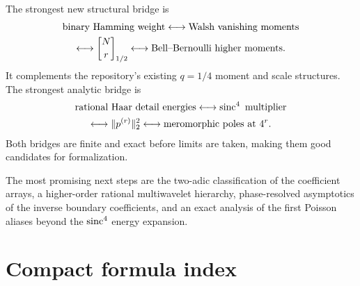 \documentclass[11pt]{article}
\theoremstyle{definition}
\theoremstyle{remark}
\begin{document}
The strongest new structural bridge is
\[
 \begin{gathered}
 \text{binary Hamming weight}
 \longleftrightarrow
 \text{Walsh vanishing moments}\\
 \longleftrightarrow
 \qbinom{N}{r}{1/2}
 \longleftrightarrow
 \text{Bell--Bernoulli higher moments}.
 \end{gathered}
\]
It complements the repository's existing $q=1/4$ moment and scale structures.
The strongest analytic bridge is
\[
 \begin{gathered}
 \text{rational Haar detail energies}
 \longleftrightarrow
 \operatorname{sinc}^4\text{ multiplier}\\
 \longleftrightarrow
 \|p^{(r)}\|_2^2
 \longleftrightarrow
 \text{meromorphic poles at }4^r.
 \end{gathered}
\]
Both bridges are finite and exact before limits are taken, making them good
candidates for formalization.

The most promising next steps are the two-adic classification of the coefficient
arrays, a higher-order rational multiwavelet hierarchy, phase-resolved
asymptotics of the inverse boundary coefficients, and an exact analysis of the
first Poisson aliases beyond the $\operatorname{sinc}^4$ energy expansion.

\appendix

\section{Compact formula index}
\label{p3:app:formula-index}
\end{document}
